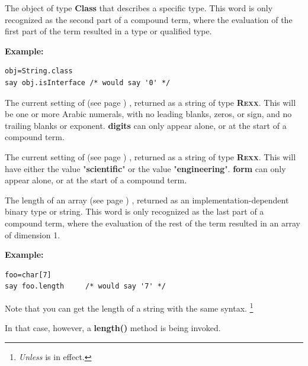 \begin{description}
The object of type \textbf{Class} that describes a specific type.
This word is only recognized as the second part of a compound term,
where the evaluation of the first part of the term resulted in a
type or qualified type.

\textbf{Example:}
\begin{lstlisting}
obj=String.class
say obj.isInterface /* would say '0' */
\end{lstlisting}
\item[digits]\label{refswdigit}
 The current setting of   (see page \pageref{refndigits}) ,
returned as a string of type \textbf{R\textsc{exx}}.
This will be one or more Arabic numerals, with no leading blanks, zeros,
or sign, and no trailing blanks or exponent.
 \textbf{digits} can only appear alone, or at the start of a
compound term.
\item[form]\label{refswform}
 The current setting of   (see page \pageref{refnform}) ,
returned as a string of type \textbf{R\textsc{exx}}.
This will have either the value "\textbf{scientific}" or the
value "\textbf{engineering}".
 \textbf{form} can only appear alone, or at the start of a
compound term.
\item[length]\label{refswleng}
 The length of an  array (see page \pageref{refarray}) , returned as an
implementation-dependent binary type or string.
This word is only recognized as the last part of a compound term,
where the evaluation of the rest of the term resulted in an array of
dimension 1.
 
\textbf{Example:}
\begin{lstlisting}
foo=char[7]
say foo.length     /* would say '7' */
\end{lstlisting}
 
Note that you can get the length of a \nr{} string with the
same syntax.
\footnote{\emph{Unless } is in effect.}

In that case, however, a \textbf{length()} method is being invoked.
\item[null]\label{refswnull}
 

\end{description}
